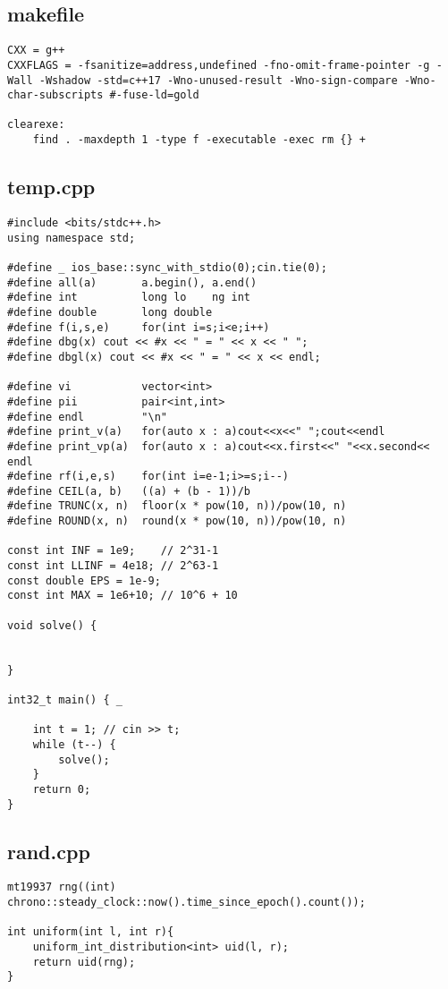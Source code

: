 \documentclass[11pt, a4paper, twoside]{article}
\begin{document}
\subsection{makefile}
\begin{lstlisting}
CXX = g++
CXXFLAGS = -fsanitize=address,undefined -fno-omit-frame-pointer -g -Wall -Wshadow -std=c++17 -Wno-unused-result -Wno-sign-compare -Wno-char-subscripts #-fuse-ld=gold

clearexe:
	find . -maxdepth 1 -type f -executable -exec rm {} +
\end{lstlisting}

\subsection{temp.cpp}
\begin{lstlisting}
#include <bits/stdc++.h>
using namespace std;

#define _ ios_base::sync_with_stdio(0);cin.tie(0);
#define all(a)       a.begin(), a.end()
#define int          long lo	ng int
#define double       long double
#define f(i,s,e) 	 for(int i=s;i<e;i++)
#define dbg(x) cout << #x << " = " << x << " ";
#define dbgl(x) cout << #x << " = " << x << endl;

#define vi 			 vector<int>
#define pii	         pair<int,int>
#define endl         "\n"
#define print_v(a)   for(auto x : a)cout<<x<<" ";cout<<endl
#define print_vp(a)  for(auto x : a)cout<<x.first<<" "<<x.second<< endl
#define rf(i,e,s) 	 for(int i=e-1;i>=s;i--)
#define CEIL(a, b)   ((a) + (b - 1))/b
#define TRUNC(x, n)  floor(x * pow(10, n))/pow(10, n)
#define ROUND(x, n)  round(x * pow(10, n))/pow(10, n)

const int INF = 1e9;    // 2^31-1
const int LLINF = 4e18; // 2^63-1
const double EPS = 1e-9;
const int MAX = 1e6+10; // 10^6 + 10

void solve() {

	
}

int32_t main() { _
	
	int t = 1; // cin >> t;
	while (t--) {
		solve();
	}
	return 0;
}
\end{lstlisting}

\subsection{rand.cpp}
\begin{lstlisting}
mt19937 rng((int) chrono::steady_clock::now().time_since_epoch().count());

int uniform(int l, int r){
	uniform_int_distribution<int> uid(l, r);
	return uid(rng);
}
\end{lstlisting}
\end{document}
